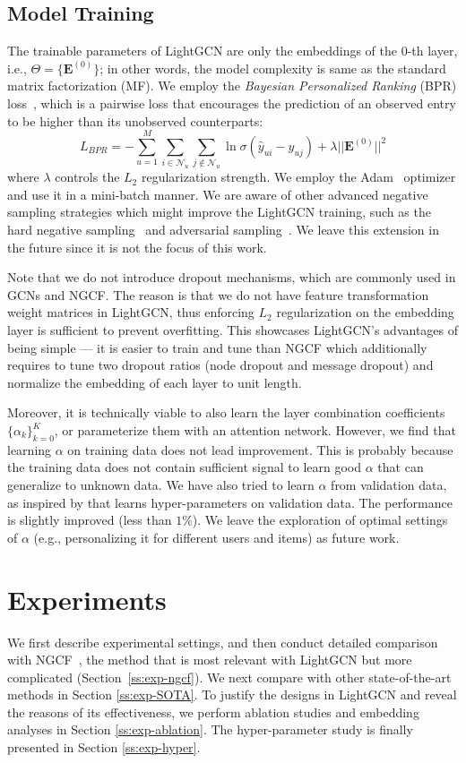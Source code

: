 \documentclass[sigconf]{acmart}
\theoremstyle{definition}
\begin{document}
\subsection{Model Training}
The trainable parameters of LightGCN are only the embeddings of the 0-th layer, i.e.,  $\Theta=\{\textbf{E}^{(0)}\}$; in other words, the model complexity is same as the standard matrix factorization (MF).
We employ the \textit{Bayesian Personalized Ranking} (BPR) loss~\cite{BPRMF}, which is a pairwise loss that encourages the prediction of an observed entry to be higher than its unobserved counterparts:
\begin{equation}
 L_{BPR} = - \sum_{u=1}^{M} \sum_{i \in \mathcal{N}_u} \sum_{j \notin \mathcal{N}_u} \ln \sigma (\hat{y}_{ui} - \hat{y}_{uj} ) + \lambda ||\textbf{E}^{(0)}||^2
\end{equation}
where $\lambda$ controls the $L_2$ regularization strength. We employ the Adam~\cite{Adam} optimizer and use it in a mini-batch manner.
We are aware of other advanced negative sampling strategies which might improve the LightGCN training, such as the hard negative sampling~\cite{rendle2014improving} and adversarial sampling~\cite{Ding2019IJCAI}. We leave this extension in the future since it is not the focus of this work. 

Note that we do not introduce dropout mechanisms, which are commonly used in GCNs and NGCF. The reason is that we do not have feature transformation weight matrices in LightGCN, thus enforcing $L_2$ regularization on the embedding layer is sufficient to prevent overfitting. 
This showcases LightGCN's advantages of being simple --- it is easier to train and tune than NGCF which additionally requires to tune two dropout ratios (node dropout and message dropout) and normalize the embedding of each layer to unit length. 

Moreover, it is technically viable to also learn the layer combination coefficients $\{\alpha_k\}_{k=0}^K$, or parameterize them with an attention network. However, we find that learning $\alpha$ on training data does not lead improvement. This is probably because the training data does not contain sufficient signal to learn good $\alpha$ that can generalize to unknown data. We have also tried to learn $\alpha$ from validation data, as inspired by \cite{lambdaOpt} that learns hyper-parameters on validation data. The performance is slightly improved (less than $1\%$). We leave the exploration of optimal settings of $\alpha$ (e.g., personalizing it for different users and items) as future work.  \section{Experiments}\label{sec:experiments}
We first describe experimental settings, and then conduct detailed comparison with NGCF~\cite{NGCF}, the method that is most relevant with LightGCN but more complicated (Section~\ref{ss:exp-ngcf}). We next compare with other state-of-the-art methods in Section \ref{ss:exp-SOTA}. To justify the designs in LightGCN and reveal the reasons of its effectiveness, we perform ablation studies and embedding analyses in Section \ref{ss:exp-ablation}. The hyper-parameter study is finally presented in Section \ref{ss:exp-hyper}. 
\end{document}
